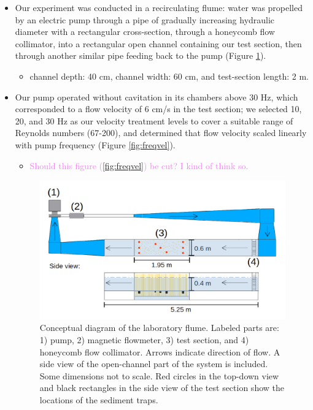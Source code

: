 \documentclass{article}
\begin{document}
\begin{itemize}
    \item Our experiment was conducted in a recirculating flume: water was propelled by an electric pump through a pipe of gradually increasing hydraulic diameter with a rectangular cross-section, through a honeycomb flow collimator, into a rectangular open channel containing our test section, then through another similar pipe feeding back to the pump (Figure \ref{fig:floorplan}).
    \begin{itemize}
        \item channel depth: 40 cm, channel width: 60 cm, and test-section length: 2 m.
    \end{itemize}
    \item Our pump operated without cavitation in its chambers above 30 Hz, which corresponded to a flow velocity of 6 cm/s in the test section; we selected 10, 20, and 30 Hz as our velocity treatment levels to cover a suitable range of Reynolds numbers (67-200), and determined that flow velocity scaled linearly with pump frequency (Figure \ref{fig:freqvel}).
    \begin{itemize}
        \item \textcolor{violet}{Should this figure (\ref{fig:freqvel}) be cut? I kind of think so.}
    \end{itemize}

\begin{figure}[htbp]
\includegraphics[width=15cm]{../pics/flume_with_sedtraps.png}
\centering
\caption{Conceptual diagram of the laboratory flume. Labeled parts are: 1) pump, 2) magnetic flowmeter, 3) test section, and 4) honeycomb flow collimator. Arrows indicate direction of flow. A side view of the open-channel part of the system is included. Some dimensions not to scale. Red circles in the top-down view and black rectangles in the side view of the test section show the locations of the sediment traps.}
\label{fig:floorplan}
\end{figure}


\end{itemize}
\end{document}
